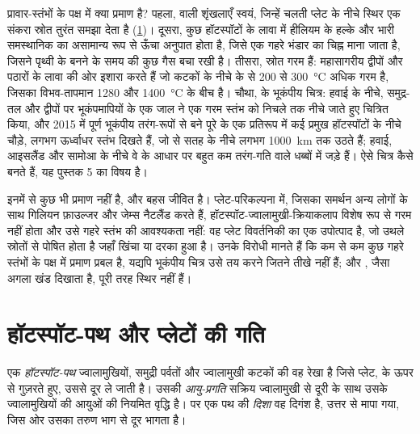 प्रावार-स्तंभों के पक्ष में क्या प्रमाण है? पहला,  वाली शृंखलाएँ स्वयं, जिन्हें चलती प्लेट के नीचे स्थिर एक संकरा स्रोत तुरंत समझा देता है (\cref{sec:b1:hotspots:tracks})। दूसरा, कुछ हॉटस्पॉटों के लावा में हीलियम के हल्के और भारी समस्थानिक का असामान्य रूप से ऊँचा अनुपात होता है, जिसे एक गहरे भंडार का चिह्न माना जाता है, जिसने पृथ्वी के बनने के समय की कुछ गैस बचा रखी है। तीसरा, स्रोत गरम हैं: महासागरीय द्वीपों और पठारों के लावा  की ओर इशारा करते हैं जो कटकों के नीचे के  से 200 से \qty{300}{\celsius} अधिक गरम है, जिसका विभव-तापमान 1280 और \qty{1400}{\celsius} के बीच है। चौथा,  के भूकंपीय चित्र: हवाई के नीचे, समुद्र-तल और द्वीपों पर भूकंपमापियों के एक जाल ने एक गरम स्तंभ को निचले  तक नीचे जाते हुए चित्रित किया, और 2015 में पूर्ण भूकंपीय तरंग-रूपों से बने पूरे  के एक प्रतिरूप में कई प्रमुख हॉटस्पॉटों के नीचे चौड़े, लगभग ऊर्ध्वाधर स्तंभ दिखते हैं, जो  से सतह के नीचे लगभग \qty{1000}{km} तक उठते हैं; हवाई, आइसलैंड और सामोआ के नीचे वे  के आधार पर बहुत कम तरंग-गति वाले धब्बों में जड़े हैं। ऐसे चित्र कैसे बनते हैं, यह पुस्तक 5 का विषय है।

इनमें से कुछ भी प्रमाण नहीं है, और बहस जीवित है। प्लेट-परिकल्पना में, जिसका समर्थन अन्य लोगों के साथ गिलियन फ़ाउल्जर और जेम्स नैटलैंड करते हैं, हॉटस्पॉट-ज्वालामुखी-क्रियाकलाप विशेष रूप से गरम नहीं होता और उसे गहरे स्तंभ की आवश्यकता नहीं: वह प्लेट विवर्तनिकी का एक उपोत्पाद है, जो उथले स्रोतों से पोषित होता है जहाँ  खिंचा या दरका हुआ है। उनके विरोधी मानते हैं कि कम से कम कुछ गहरे स्तंभों के पक्ष में प्रमाण प्रबल है, यद्यपि भूकंपीय चित्र उसे तय करने जितने तीखे नहीं हैं; और , जैसा अगला खंड दिखाता है, पूरी तरह स्थिर नहीं हैं।

\section{हॉटस्पॉट-पथ और प्लेटों की गति}\label{sec:b1:hotspots:tracks}

\begin{definition}[हॉटस्पॉट-पथ; आयु-प्रगति]
\label{def:b1:hotspots:track}
एक \emph{हॉटस्पॉट-पथ} ज्वालामुखियों, समुद्री पर्वतों और ज्वालामुखी कटकों की वह रेखा है जिसे प्लेट,  के ऊपर से गुज़रते हुए, उससे दूर ले जाती है। उसकी \emph{आयु-प्रगति} सक्रिय ज्वालामुखी से दूरी के साथ उसके ज्वालामुखियों की आयुओं की नियमित वृद्धि है।  पर एक पथ की \emph{दिशा} वह दिगंश है, उत्तर से मापा गया, जिस ओर उसका तरुण भाग  से दूर भागता है।
\end{definition}

